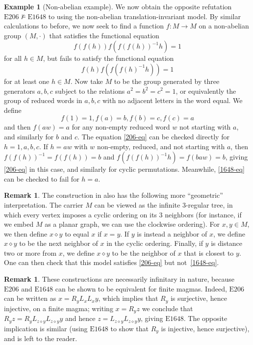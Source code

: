 \documentclass[12pt]{amsart}
\theoremstyle{definition}
\newtheorem{example}[theorem]{Example}
\newtheorem{remark}[theorem]{Remark}
\newcommand{\op}{\diamond}
\newcommand{\nmodels}{\not\models}
\newcommand{\Eq}[1]{\mathrm{E}#1}
\begin{document}
\begin{example}[Non-abelian example]\label{trans-nonab}  We now obtain the opposite refutation $\Eq{206} \nmodels \Eq{1648}$ to  using the non-abelian translation-invariant model.  By similar calculations to before, we now seek to find a function $f \colon M \to M$ on a non-abelian group $(M,\cdot)$ that satisfies the functional equation
\begin{equation}\label{206-eq}
 f(f(h)) f(f(f(h))^{-1} h) = 1
\end{equation}
for all $h \in M$, but fails to satisfy the functional equation
\begin{equation}\label{1648-eq}
   f(h) f(f(f(h)^{-1} h)) = 1
\end{equation}
for at least one $h \in M$.  Now take $M$ to be the group generated by three generators $a,b,c$ subject to the relations $a^2=b^2=c^2=1$, or equivalently the group of reduced words in $a,b,c$ with no adjacent letters in the word equal.  We define
$$ f(1) = 1, f(a)=b, f(b) = c, f(c) = a$$
and then $f(aw)=a$ for any non-empty reduced word $w$ not starting with $a$, and similarly for $b$ and $c$.  The equation \eqref{206-eq} can be checked directly for $h=1,a,b,c$.  If $h=aw$ with $w$ non-empty, reduced, and not starting with $a$, then $f(f(h))^{-1} = f(f(h)) = b$ and $f(f(f(h))^{-1} h) = f(baw) = b$, giving \eqref{206-eq} in this case, and similarly for cyclic permutations. Meanwhile, \eqref{1648-eq} can be checked to fail for $h=a$.
\end{example}

\begin{remark}  The construction in  also has the following more ``geometric'' interpretation.  The carrier $M$ can be viewed as the infinite $3$-regular tree, in which every vertex imposes a cyclic ordering on its $3$ neighbors (for instance, if we embed $M$ as a planar graph, we can use the clockwise ordering).  For $x,y \in M$, we then define $x \op y$ to equal $x$ if $x=y$.  If $y$ is instead a neighbor of $x$, we define $x \op y$ to be the next neighbor of $x$ in the cyclic ordering.  Finally, if $y$ is distance two or more from $x$, we define $x \op y$ to be the neighbor of $x$ that is closest to $y$.  One can then check that this model satisfies \eqref{206-eq} but not~\eqref{1648-eq}.
\end{remark}

\begin{remark} These constructions are necessarily infinitary in nature, because $\Eq{206}$ and $\Eq{1648}$ can be shown to be equivalent for finite magmas. Indeed, $\Eq{206}$ can be written as $x = R_y L_x L_x y$, which implies that $R_y$ is surjective, hence injective, on a finite magma; writing $x = R_y z$ we conclude that $R_y z = R_y L_{z \op y} L_{z \op y} y$ and hence $z = L_{z \op y} L_{z \op y} y$, giving $\Eq{1648}$.  The opposite implication is similar (using $\Eq{1648}$ to show that $R_y$ is injective, hence surjective), and is left to the reader.
\end{remark}
\end{document}
